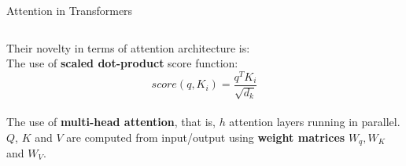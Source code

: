 \documentclass[9pt]{beamer}
\begin{document}
\iffalse
\begin{frame}{Attention in Transformers}
\begin{columns}[onlytextwidth]
    \begin{column}{0.50\textwidth}
    Their novelty in terms of attention architecture is:\\
    The use of \textbf{scaled dot-product} score function:
    \vspace{0.15cm}
    $$score(q,K_i) = \displaystyle \frac{q^TK_i}{\sqrt{d_k}} $$ \\
    The use of \textbf{multi-head attention}, that is, $h$ attention layers running in parallel.\vspace{0.15cm}\\
    $Q$, $K$ and $V$ are computed from input/output using \textbf{weight matrices} $W_q, W_K$ and $W_V$.
    \end{column}
\end{columns}
\end{frame}
\end{document}
